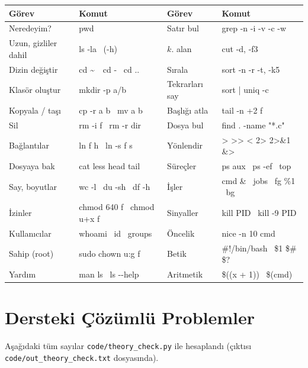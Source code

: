 \begin{center}
\vspace{0.6em}
\renewcommand{\arraystretch}{1.15}
\begin{tabularx}{\linewidth}{@{}>{\raggedright\arraybackslash}p{3.0cm}>{\ttfamily\raggedright\arraybackslash}X>{\raggedright\arraybackslash}p{3.0cm}>{\ttfamily\raggedright\arraybackslash}X@{}}
\toprule
\textbf{Görev} & \textbf{\rmfamily Komut} & \textbf{Görev} & \textbf{\rmfamily Komut} \\
\midrule
Neredeyim? & pwd & Satır bul & grep -n -i -v -c -w \\
Uzun, gizliler dahil & ls -la \ (-h) & $k$. alan & cut -d, -f3 \\
Dizin değiştir & cd \textasciitilde\ \ cd - \ cd .. & Sırala & sort -n -r -t, -k5 \\
Klasör oluştur & mkdir -p a/b & Tekrarları say & sort | uniq -c \\
Kopyala / taşı & cp -r a b \ mv a b & Başlığı atla & tail -n +2 f \\
Sil & rm -i f \ rm -r dir & Dosya bul & find . -name "*.c" \\
Bağlantılar & ln f h \ ln -s f s & Yönlendir & > >> < 2> 2>\&1 \&> \\
Dosyaya bak & cat less head tail & Süreçler & ps aux \ ps -ef \ top \\
Say, boyutlar & wc -l \ du -sh \ df -h & İşler & cmd \& \ jobs \ fg \%1 \ bg \\
İzinler & chmod 640 f \ chmod u+x f & Sinyaller & kill PID \ kill -9 PID \\
Kullanıcılar & whoami \ id \ groups & Öncelik & nice -n 10 cmd \\
Sahip (root) & sudo chown u:g f & Betik & \#!/bin/bash \ \$1 \$\# \$? \\
Yardım & man ls \ ls -{}-help & Aritmetik & \$((x + 1)) \ \$(cmd) \\
\bottomrule
\end{tabularx}
\end{center}

\section{Dersteki Çözümlü Problemler}
\label{sec:lecture}

Aşağıdaki tüm sayılar \texttt{code/theory\_check.py} ile hesaplandı (çıktısı \texttt{code/out\_theory\_check.txt} dosyasında).

